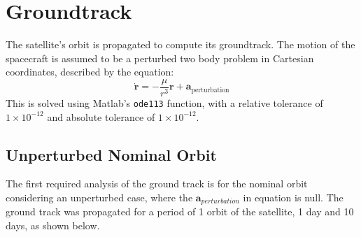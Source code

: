 \documentclass{article}
\begin{document}
\section{Groundtrack}
The satellite's orbit is propagated to compute its groundtrack. The motion of the spacecraft is assumed to be a perturbed two body problem in Cartesian coordinates, described by the equation:
\[
\dot{\mathbf{r}} = -\frac{\mu}{r^3} \mathbf{r} + \mathbf{a}_{\text{perturbation}}
\]
This is solved using Matlab's \texttt{ode113} function, with a relative tolerance of \(1 \times 10^{-12}\) and absolute tolerance of \(1 \times 10^{-12}\).

\subsection{Unperturbed Nominal Orbit}

The first required analysis of the ground track is for the nominal orbit considering an unperturbed case, where the $\mathbf{a}_{perturbation}$ in equation is null. The ground track was propagated for a period of 1 orbit of the satellite, 1 day and 10 days, as shown below.
\end{document}
